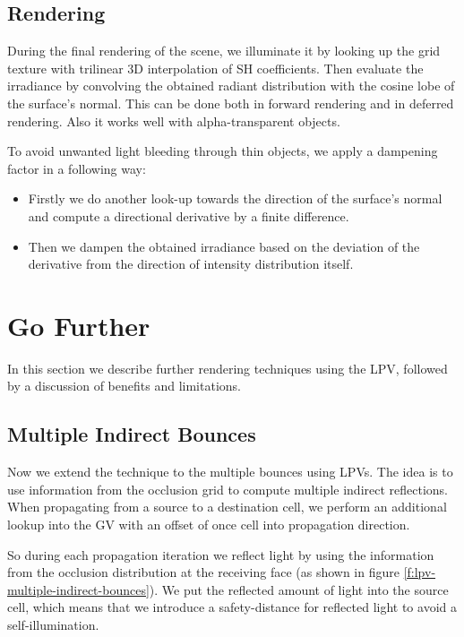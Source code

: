 \subsection{Rendering}
During the final rendering of the scene, we illuminate it by looking up the grid texture with trilinear 3D interpolation of SH coefficients. Then evaluate the irradiance by convolving the obtained radiant distribution with the cosine lobe of the surface's normal. This can be done both in forward rendering and in deferred rendering. Also it works well with alpha-transparent objects.

To avoid unwanted light bleeding through thin objects, we apply a dampening factor in a following way:

\begin{itemize}
	\item Firstly we do another look-up towards the direction of the surface's normal and compute a directional derivative by a finite difference.
	\item Then we dampen the obtained irradiance based on the deviation of the derivative from the direction of intensity distribution itself.
\end{itemize}




\section{Go Further}
In this section we describe further rendering techniques using the LPV, followed by a discussion of benefits and limitations.

\subsection{Multiple Indirect Bounces}
Now we extend the technique to the multiple bounces using LPVs. The idea is to use information from the occlusion grid to compute multiple indirect reflections. When propagating from a source to a destination cell, we perform an additional lookup into the GV with an offset of once cell into propagation direction.



So during each propagation iteration we reflect light by using the information from the occlusion distribution at the receiving face (as shown in figure \ref{f:lpv-multiple-indirect-bounces}). We put the reflected amount of light into the source cell, which means that we introduce a safety-distance for reflected light to avoid a self-illumination.



